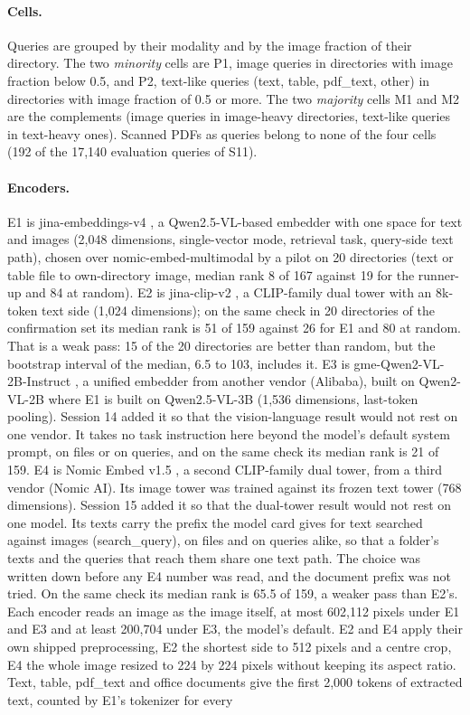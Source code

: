 \documentclass[11pt]{article}
\begin{document}
\paragraph{Cells.} Queries are grouped by their modality and by the image fraction of their directory. The two \emph{minority} cells are P1, image queries in directories with image fraction below 0.5, and P2, text-like queries (text, table, pdf\_text, other) in directories with image fraction of 0.5 or more. The two \emph{majority} cells M1 and M2 are the complements (image queries in image-heavy directories, text-like queries in text-heavy ones). Scanned PDFs as queries belong to none of the four cells (192 of the 17,140 evaluation queries of S11).

\paragraph{Encoders.} E1 is jina-embeddings-v4 \citep{gunther2025jinav4}, a Qwen2.5-VL-based embedder with one space for text and images (2,048 dimensions, single-vector mode, retrieval task, query-side text path), chosen over nomic-embed-multimodal \citep{nomic2025multimodal} by a pilot on 20 directories (text or table file to own-directory image, median rank 8 of 167 against 19 for the runner-up and 84 at random). E2 is jina-clip-v2 \citep{koukounas2024jinaclipv2}, a CLIP-family dual tower with an 8k-token text side (1,024 dimensions); on the same check in 20 directories of the confirmation set its median rank is 51 of 159 against 26 for E1 and 80 at random. That is a weak pass: 15 of the 20 directories are better than random, but the bootstrap interval of the median, 6.5 to 103, includes it. E3 is gme-Qwen2-VL-2B-Instruct \citep{zhang2025gme}, a unified embedder from another vendor (Alibaba), built on Qwen2-VL-2B where E1 is built on Qwen2.5-VL-3B (1,536 dimensions, last-token pooling). Session 14 added it so that the vision-language result would not rest on one vendor. It takes no task instruction here beyond the model's default system prompt, on files or on queries, and on the same check its median rank is 21 of 159. E4 is Nomic Embed v1.5 \citep{nussbaum2024nomicvision,nussbaum2024nomicembed}, a second CLIP-family dual tower, from a third vendor (Nomic AI). Its image tower was trained against its frozen text tower (768 dimensions). Session 15 added it so that the dual-tower result would not rest on one model. Its texts carry the prefix the model card gives for text searched against images (search\_query), on files and on queries alike, so that a folder's texts and the queries that reach them share one text path. The choice was written down before any E4 number was read, and the document prefix was not tried. On the same check its median rank is 65.5 of 159, a weaker pass than E2's. Each encoder reads an image as the image itself, at most 602,112 pixels under E1 and E3 and at least 200,704 under E3, the model's default. E2 and E4 apply their own shipped preprocessing, E2 the shortest side to 512 pixels and a centre crop, E4 the whole image resized to 224 by 224 pixels without keeping its aspect ratio. Text, table, pdf\_text and office documents give the first 2,000 tokens of extracted text, counted by E1's tokenizer for every 
\end{document}
